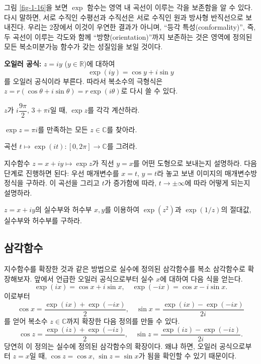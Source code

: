 그림 \ref{fig-1-16}을 보면
$\exp$ 함수는 영역 내 곡선이 이루는 각을 보존함을 알 수 있다.
다시 말하면, 서로 수직인 수평선과 수직선은 서로 수직인 원과 방사형 반직선으로 보내진다.
우리는 2장에서 이것이 우연한 결과가 아니며, ``등각 특성(conformality)'', 즉, 
두 곡선이 이루는 각도와 함께 ``방향(orientation)''까지 보존하는 것은
영역에 정의된 모든 복소미분가능 함수가 갖는 성질임을 보일 것이다.

{\bf 오일러 공식: }
$z=iy$ ($y\in \mathbb R$)에 대하여
$$
\exp(iy) = \cos y + i \sin y
$$
를 오일러 공식이라 부른다.
따라서 복소수의 극형식은 $z=r(\cos\theta + i\sin\theta) = r\exp(i\theta)$로
다시 쓸 수 있다.

\begin{salt_exercise} \label{ex-1-31}
$z$가 $i\dfrac{9\pi}2$, $3+\pi i$일 때,
$\exp z$를 각각 계산하라.
\end{salt_exercise}

\begin{salt_exercise} \label{ex-1-32}
$\exp z = \pi i$를 만족하는 모든 $z\in\mathbb C$를 찾아라.
\end{salt_exercise}

\begin{salt_exercise} \label{ex-1-33}
곡선 $t\mapsto \exp(it):[0,2\pi] \to \mathbb C$를 그려라.
\end{salt_exercise}

\begin{salt_exercise} \label{ex-1-34}
지수함수 $z=x+iy \mapsto \exp z$가 직선 $y=x$를 어떤 도형으로 보내는지 설명하라.
다음 단계로 진행하면 된다:
우선 매개변수를 $x=t$, $y=t$라 놓고
보낸 이미지의 매개변수방정식을 구하라.
이 곡선을 그리고 $t$가 증가함에 따라, $t\to\pm\infty$에 따라 어떻게 되는지 설명하라.
\end{salt_exercise}

\begin{salt_exercise} \label{ex-1-35}
$z=x+iy$의 실수부와 허수부 $x,y$를 이용하여
$\exp(z^2)$과 $\exp(1/z)$의 절대값, 실수부와 허수부를 구하라.
\end{salt_exercise}


\subsection{삼각함수}\label{sec-1-4-2}

지수함수를 확장한 것과 같은 방법으로
실수에 정의된 삼각함수를 복소 삼각함수로 확장해보자.
앞에서 언급한 오일러 공식으로부터 실수 $x$에 대하여 다음 식을 얻는다.
$$
\exp(ix) = \cos x + i \sin x, \quad
\exp(-ix) = \cos x - i \sin x.
$$
이로부터 
$$
\cos x = \dfrac{\exp(ix) + \exp(-ix)}2, \quad
\sin x = \dfrac{\exp(ix) - \exp(-ix)}{2i}
$$
를 얻어 복소수 $z\in\mathbb C$까지 확장한 다음 정의를 만들 수 있다.
$$
\cos z = \dfrac{\exp(iz) + \exp(-iz)}2, \quad
\sin z = \dfrac{\exp(iz) - \exp(-iz)}{2i}.
$$
당연히 이 정의는 실수에 정의된 삼각함수의 확장이다.
왜냐 하면, 오일러 공식으로부터 
$z=x$일 때, $\cos z = \cos x$, $\sin z = \sin x$가 됨을 확인할 수 있기 때문이다.

